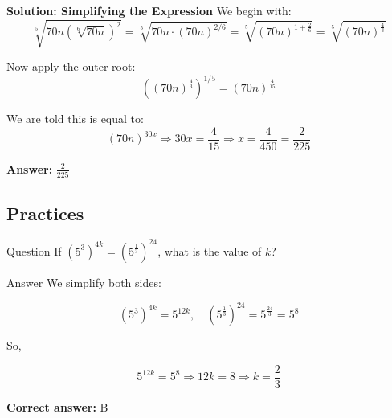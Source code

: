 \documentclass{beamer}
\begin{document}
\begin{frame}{\textbf{Solution: Simplifying the Expression}}
We begin with:
\[
\sqrt[5]{70n \left( \sqrt[6]{70n} \right)^2}
= \sqrt[5]{70n \cdot (70n)^{2/6}}
= \sqrt[5]{(70n)^{1 + \frac{2}{6}}}
= \sqrt[5]{(70n)^{\frac{4}{3}}}
\]

Now apply the outer root:
\[
\left( (70n)^{\frac{4}{3}} \right)^{1/5} = (70n)^{\frac{4}{15}}
\]

We are told this is equal to:
\[
(70n)^{30x}
\Rightarrow 30x = \frac{4}{15}
\Rightarrow x = \frac{4}{450} = \frac{2}{225}
\]

\textbf{Answer:} \( \boxed{\frac{2}{225}} \)
\end{frame}

\begin{frame}
\section{Practices}
\end{frame}
\begin{frame}{Question}
If $\left(5^3\right)^{4k} = \left(5^{\frac{1}{3}}\right)^{24}$, what is the value of $k$?


\end{frame}

\begin{frame}{Answer}
We simplify both sides:

\[
(5^3)^{4k} = 5^{12k}, \quad \left(5^{\frac{1}{3}}\right)^{24} = 5^{\frac{24}{3}} = 5^8
\]

So,

\[
5^{12k} = 5^8 \Rightarrow 12k = 8 \Rightarrow k = \frac{2}{3}
\]

\textbf{Correct answer:} B
\end{frame}
\end{document}
